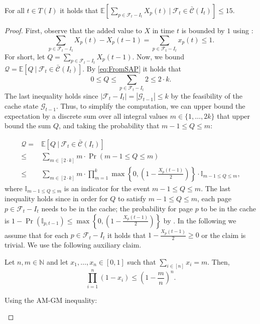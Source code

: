 \documentclass[11pt]{article}
\newcommand{\cG}{{\mathcal{G}}}
\newcommand{\cF}{{\mathcal{F}}}
\newcommand{\cC}{{\mathcal{C}}}
\newcommand{\E}{{\mathbb{E}}}
\newcommand{\bbc}{{\bar{\cC}(I_t)}}
\begin{document}
{	\begin{lemma}
	\label{lem:sumX}
	For all $t \in T(I)$ it holds that $\E \left[ \sum_{p \in \cF_t-I_t} X_p(t) ~\big|~\cF_t \in \bbc \right] \leq 15$. 
\end{lemma}

\begin{proof}
	First, observe that the added value to $X$ in time $t$ is bounded by $1$ using :
	\begin{equation}
		\label{eq:X1}
	\sum_{p \in \cF_t-I_t} X_p(t)-X_p(t-1) = 	\sum_{p \in \cF_t-I_t} x_p(t) \leq 1.
	\end{equation} For short, let $Q = \sum_{p \in \cF_t-I_t} X_p(t-1)$. Now, we bound $\mathcal{Q} = \E \left[ Q ~\big|~\cF_t \in \bbc \right]$. By \eqref{eq:FromSAP} it holds that $$0 \leq Q\leq \sum_{p \in \cF_t-I_t} 2 \leq 2 \cdot k.$$
	The last inequality holds since $|\cF_t-I_t| = |\cG_{t-1}| \leq k$ by the feasibility of the cache state $\cG_{t-1}$. Thus, to simplify the computation, we can upper bound the expectation by a discrete sum over all integral values $m \in \{1,\ldots, 2k\}$ that upper bound the sum $Q$, and taking the probability that $m-1 \leq Q \leq m$:  

\begin{equation}
		\label{eq:sum}
	\begin{aligned}
	\mathcal{Q} = {} &	\E \left[ Q ~\big|~\cF_t \in \bbc \right] \\
	\leq{} & \sum_{m \in \left[ 2 \cdot k\right]} m \cdot \Pr \left(m-1 \leq Q \leq m \right) \\
		\leq{} &  \sum_{m \in \left[ 2 \cdot k\right]} m \cdot \prod_{m=1}^{k} \max \left\{0,\left( 1-\frac{X_p(t-1)}{2}\right) \right\} \cdot \mathbb{I}_{m-1 \leq Q \leq m},
	\end{aligned}
\end{equation}
 where $\mathbb{I}_{m-1 \leq Q \leq m}$ is an indicator for the event $m-1 \leq Q \leq m$. The last inequality holds since in order for $Q$ to satisfy $m-1 \leq Q \leq m$, each page $p \in \cF_t-I_t$ needs to be in the cache; the probability for page $p$ to be in the cache is $1-\Pr\left( \mathbb{I}_{p,{t-1}}\right) \leq \max \left\{0,\left( 1-  \frac{X_p(t-1)}{2}\right)\right\}$ by . In the following we assume that for each $p \in \cF_t-I_t$ it holds that $1-\frac{X_p(t-1)}{2} \geq 0$ or the claim is trivial. We use the following auxiliary claim. 
 
 	\begin{claim}
\label{claim:MAX}
 	Let $n,m \in \mathbb{N}$ and let $x_1,\ldots , x_n \in [0,1]$ such that $\sum_{i \in [n]} x_i = m$. Then, $$\prod^{n}_{i = 1} (1-x_i) \leq \left(1-\frac{m}{n}\right)^n.$$ 
 \end{claim}
 \begin{claimproof}
 	Using the AM-GM inequality:
 	

\end{claimproof}
\end{proof}}
\end{document}
